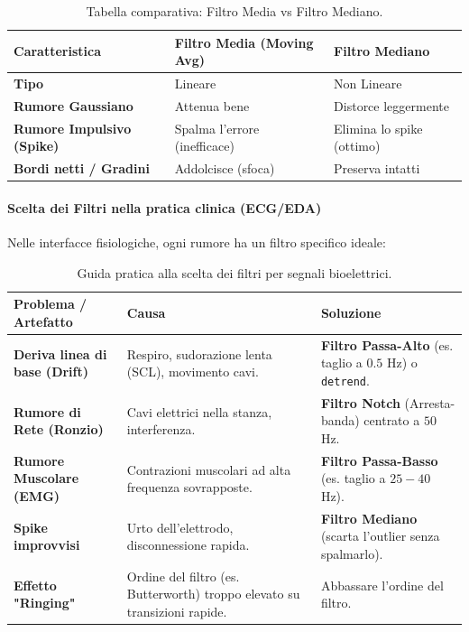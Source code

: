\vspace{0.5cm}
\begin{table}[h!]
    \centering
    \begin{tabular}{|p{4.5cm}|p{5cm}|p{5cm}|}
        \hline
        \textbf{Caratteristica} & \textbf{Filtro Media (Moving Avg)} & \textbf{Filtro Mediano} \\
        \hline
        \textbf{Tipo} & Lineare & Non Lineare \\
        \hline
        \textbf{Rumore Gaussiano} & Attenua bene & Distorce leggermente \\
        \hline
        \textbf{Rumore Impulsivo (Spike)} & Spalma l'errore (inefficace) & Elimina lo spike (ottimo) \\
        \hline
        \textbf{Bordi netti / Gradini} & Addolcisce (sfoca) & Preserva intatti \\
        \hline
    \end{tabular}
    \caption{Tabella comparativa: Filtro Media vs Filtro Mediano.}
\end{table}
\vspace{0.5cm}

\paragraph{Scelta dei Filtri nella pratica clinica (ECG/EDA)}
Nelle interfacce fisiologiche, ogni rumore ha un filtro specifico ideale:
\vspace{0.3cm}
\begin{table}[h!]
    \centering
    \begin{tabular}{|p{4.5cm}|p{5.5cm}|p{4cm}|}
        \hline
        \textbf{Problema / Artefatto} & \textbf{Causa} & \textbf{Soluzione} \\
        \hline
        \textbf{Deriva linea di base (Drift)} & Respiro, sudorazione lenta (SCL), movimento cavi. & \textbf{Filtro Passa-Alto} (es. taglio a $0.5$ Hz) o \texttt{detrend}. \\
        \hline
        \textbf{Rumore di Rete (Ronzio)} & Cavi elettrici nella stanza, interferenza. & \textbf{Filtro Notch} (Arresta-banda) centrato a $50$ Hz. \\
        \hline
        \textbf{Rumore Muscolare (EMG)} & Contrazioni muscolari ad alta frequenza sovrapposte. & \textbf{Filtro Passa-Basso} (es. taglio a $25-40$ Hz). \\
        \hline
        \textbf{Spike improvvisi} & Urto dell'elettrodo, disconnessione rapida. & \textbf{Filtro Mediano} (scarta l'outlier senza spalmarlo). \\
        \hline
        \textbf{Effetto "Ringing"} & Ordine del filtro (es. Butterworth) troppo elevato su transizioni rapide. & Abbassare l'ordine del filtro. \\
        \hline
    \end{tabular}
    \caption{Guida pratica alla scelta dei filtri per segnali bioelettrici.}
\end{table}
\vspace{0.3cm}
